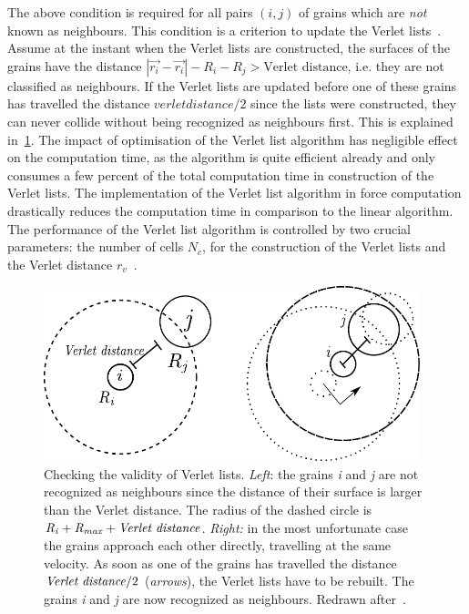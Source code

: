 The above condition is required for all pairs $(\mathit{i},\mathit{j})$ of 
grains which are \textit{not} known as neighbours. This condition is a 
criterion to update the Verlet lists~\citep{Poschel2005}. Assume at the instant 
when the Verlet lists are constructed, the surfaces of the grains have the 
distance $\left| \overrightarrow{r_{\mathit{i}}} - 
\overrightarrow{r_{\mathit{i}}}\right| - 
\mathit{R}_{\mathit{i}}-\mathit{R}_{\mathit{j}} > 
\mbox{Verlet distance}$, i.e. they are not classified as neighbours. If the 
Verlet lists are updated before one of these grains has travelled the distance 
$\mathit{verlet distance}/2$ since the lists were constructed, they can never 
collide without being recognized as neighbours first. This is explained 
in~\cref{fig:Verlet}. The impact of optimisation of the Verlet list 
algorithm has negligible effect on the computation time, as the algorithm is 
quite efficient already and only consumes a few percent of the total 
computation time in construction of the Verlet lists. The implementation of the 
Verlet list algorithm in force computation drastically reduces the computation 
time in comparison to the linear algorithm. The performance of the Verlet list 
algorithm is controlled by two crucial parameters: the number of cells 
$\mathit{N}_{\mathit{c}}$, for the construction of the Verlet lists and the 
Verlet distance $r_{\mathit{v}}$~\citep{Poschel2005}.

\begin{figure}[htbp]
\centering
\includegraphics[width=0.975\textwidth]{Verlet}
\caption[Checking the validity of Verlet list]{Checking the validity of Verlet 
lists. \textit{Left}: the grains \textit{i} and \textit{j} are not recognized 
as neighbours since the distance of their surface is larger than the Verlet 
distance. The radius of the dashed circle is 
$\mathit{R}_{\mathit{i}}+\mathit{R}_{\mathit{max}}+\mbox{\textit{Verlet 
distance}}$. \textit{Right:} in the most unfortunate case the grains approach 
each other directly, travelling at the same velocity. As soon as one of the 
grains has travelled the distance $\mbox{\textit{Verlet distance}}/2$ 
(\textit{arrows}), the Verlet lists have to be rebuilt. The grains \textit{i} 
and \textit{j} are now recognized as neighbours. Redrawn 
after~\citet{Poschel2005}.}
\label{fig:Verlet}
\end{figure}

